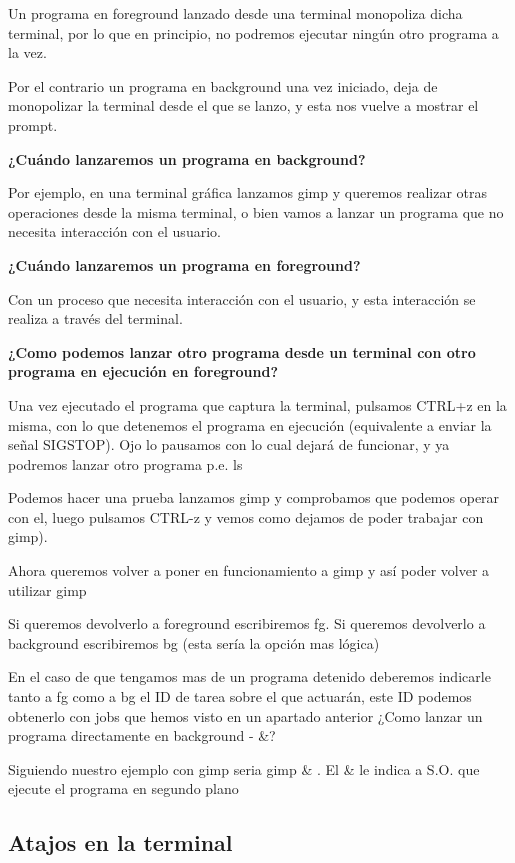 \documentclass[12pt]{article}
\begin{document}
Un programa en foreground lanzado desde una terminal monopoliza dicha
terminal, por lo que en principio, no podremos ejecutar ningún otro 
programa a la vez. 

Por el contrario un programa en background una vez iniciado, deja de 
monopolizar la terminal desde el que se lanzo, y esta nos vuelve a 
mostrar el prompt.

{\bf ¿Cuándo lanzaremos un programa en background?}

Por ejemplo, en una terminal gráfica lanzamos gimp y queremos realizar 
otras operaciones desde la misma terminal, o bien vamos a lanzar un 
programa que no necesita interacción con el usuario. 


{\bf ¿Cuándo lanzaremos un programa en foreground?}

Con un proceso que necesita interacción con el usuario, y esta 
interacción se realiza a través del terminal.

{\bf ¿Como podemos lanzar otro programa desde un terminal con otro programa 
en ejecución en foreground?}

Una vez ejecutado el programa que captura la terminal, pulsamos CTRL+z 
en la misma, con lo que detenemos el programa en ejecución (equivalente
a enviar la señal SIGSTOP). Ojo lo pausamos con lo cual dejará de 
funcionar, y ya podremos lanzar otro programa p.e. ls

    Podemos hacer una prueba lanzamos gimp y comprobamos que podemos operar con el, luego pulsamos CTRL-z y vemos como dejamos de poder trabajar con gimp).

Ahora queremos volver a poner en funcionamiento a gimp y así poder volver a utilizar gimp

    Si queremos devolverlo a foreground escribiremos fg.
    Si queremos devolverlo a background escribiremos bg (esta sería la opción mas lógica)

En el caso de que tengamos mas de un programa detenido deberemos indicarle tanto a fg como a bg el ID de tarea sobre el que actuarán, este ID podemos obtenerlo con jobs que hemos visto en un apartado anterior
¿Como lanzar un programa directamente en background - &?

Siguiendo nuestro ejemplo con gimp seria gimp & . El & le indica a S.O. que ejecute el programa en segundo plano

\subsection*{Atajos en la terminal}
 
\end{document}
